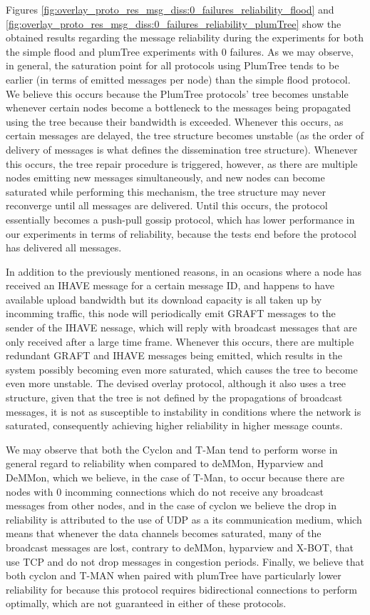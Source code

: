 Figures \ref{fig:overlay_proto_res_msg_diss:0_failures_reliability_flood} and \ref{fig:overlay_proto_res_msg_diss:0_failures_reliability_plumTree} show the obtained results regarding the message reliability during the experiments for both the simple flood and plumTree experiments with 0 failures. As we may observe, in general, the saturation point for all protocols using PlumTree tends to be earlier (in terms of emitted messages per node) than the simple flood protocol. We believe this occurs because the PlumTree protocols' tree becomes unstable whenever certain nodes become a bottleneck to the messages being propagated using the tree because their bandwidth is exceeded. Whenever this occurs, as certain messages are delayed, the tree structure becomes unstable (as the order of delivery of messages is what defines the dissemination tree structure). Whenever this occurs, the tree repair procedure is triggered, however, as there are multiple nodes emitting new messages simultaneously, and new nodes can become saturated while performing this mechanism, the tree structure may never reconverge until all messages are delivered. Until this occurs, the protocol essentially becomes a push-pull gossip protocol, which has lower performance in our experiments in terms of reliability, because the tests end before the protocol has delivered all messages.

In addition to the previously mentioned reasons, in an ocasions where a node has received an IHAVE message for a certain message ID, and happens to have available upload bandwidth but its download capacity is all taken up by incomming traffic, this node will periodically emit GRAFT messages to the sender of the IHAVE nessage, which will reply with broadcast messages that are only received after a large time frame. Whenever this occurs, there are multiple redundant GRAFT and IHAVE messages being emitted, which results in the system possibly becoming even more saturated, which causes the tree to become even more unstable. The devised overlay protocol, although it also uses a tree structure, given that the tree is not defined by the propagations of broadcast messages, it is not as susceptible to instability in conditions where the network is saturated, consequently achieving higher reliability in higher message counts. 

We may observe that both the Cyclon and T-Man tend to perform worse in general regard to reliability when compared to deMMon, Hyparview and DeMMon, which we believe, in the case of T-Man, to occur because there are nodes with 0 incomming connections which do not receive any broadcast messages from other nodes, and in the case of cyclon we believe the drop in reliability is attributed to the use of UDP as a its communication medium, which means that whenever the data channels becomes saturated, many of the broadcast messages are lost, contrary to deMMon, hyparview and X-BOT, that use TCP and do not drop messages in congestion periods. Finally, we believe that both cyclon and T-MAN when paired with plumTree have particularly lower reliability for because this protocol requires bidirectional connections to perform optimally, which are not guaranteed in either of these protocols. 

